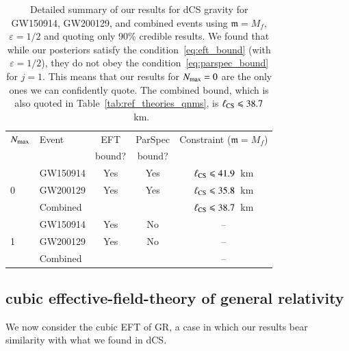 \documentclass[twocolumn,
               prd,
               aps,
               superscriptaddress,
               tightenlines,
               nofootinbib,
               eqsecnum,
               amsfonts,
               amsmath,
               longbibliography]{revtex4-1}
\newcommand{\gm}{\mathfrak{m}}
\begin{document}
\begin{table}[h]
\begin{tabular}{l l c c c}
\hline
\hline
$N_{\rm max}$ & Event & EFT    & ParSpec & Constraint ($\gm = M_{f}$) \\
              &       & bound? & bound?  &                            \\
\hline
      & GW150914 & Yes & Yes & $\ell_{\rm CS} \leqslant 41.9$~km \\
0     & GW200129 & Yes & Yes & $\ell_{\rm CS} \leqslant 35.8$~km \\
      & Combined &     &     & \cellcolor{black!10}$\ell_{\rm CS} \leqslant 38.7$~km \\
\hline
      & GW150914 & Yes & No  & --                                 \\
1     & GW200129 & Yes & No  & --                                 \\
      & Combined &     &     & --                                 \\
\hline
\hline
\end{tabular}
\caption{Detailed summary of our results for dCS gravity for GW150914, GW200129, and
combined events using $\gm = M_{f}$, $\varepsilon = 1/2$ and quoting only 90\% credible results.
%
We found that while our posteriors satisfy the condition~\eqref{eq:eft_bound} (with $\varepsilon = 1/2$),
they do not obey the condition~\eqref{eq:parspec_bound} for $j = 1$. This means
that our results for $N_{\rm max}=0$ are the only ones we can confidently quote.
%
The combined bound, which is also quoted in Table~\ref{tab:ref_theories_qnms},
is $\ell_{\rm CS} \leqslant 38.7$~km.
}
\label{tab:summary_dcs}
\end{table}

\subsection{cubic effective-field-theory of general relativity}
\label{sec:results_ceft}

We now consider the cubic EFT of GR, a case in which our results bear
similarity with what we found in dCS.
\end{document}
